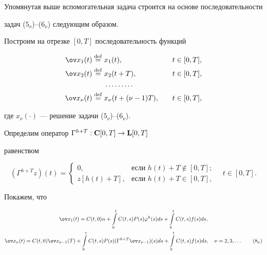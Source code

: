 Упомянутая выше вспомогательная задача строится на основе последовательности


задач ($5_{\nu}$)--($6_{\nu}$) следующим образом.





Построим на отрезке $[0,T]$ последовательность функций


\begin{alignat*}{2}


{\ov x_1}(t)\eqdef & x_1(t), &\quad t &\in [0,T], \\


%


{\ov x_2}(t)\eqdef & x_2(t+T), &\quad t &\in [0,T], \\


%


&\dotsc\dotsc\dotsc & \quad &\ \\


%


{\ov x_{\nu}}(t)\eqdef & x_{\nu}(t+(\nu -1)T), &\quad t &\in [0,T],


\end{alignat*}


где $x_{\nu}(\cdot)$ --- решение задачи ($5_{\nu}$)--($6_{\nu}$).


Определим оператор ${\Gamma}^{h+T}:{\bold C}[0,T]\to {\bold L}[0,T]$


равенством


$$


({\Gamma}^{h+T}z)(t)=


\begin{cases}


0, & \text{если } h(t)+T\notin [0,T];\\


z[h(t)+T], & \text{если } h(t)+T\in [0,T],


\end{cases}


\quad t\in [0,T].


$$


Покажем, что\addtocounter{equation}{2}


\begin{gather}


{\ov x_1}(t)=C(t,0){\alpha}+\int\limits_0^tC(t,s)P(s)


{\varphi}^h(s)ds+


\int\limits_0^tC(t,s)f(s)ds, \\


%


{\ov x_{\nu}}(t)=C(t,0){\ov x_{\nu -1}}(T)+


\int\limits_0^tC(t,s)P(s)({\Gamma}^{h+T}{\ov x_{\nu -1}})(s)ds+


\int\limits_0^tC(t,s)f(s)ds,\quad


{\nu}=2,3,\dotsc \tag{$8_\nu$}


\end{gather}





